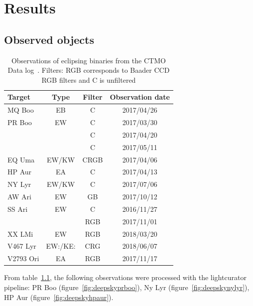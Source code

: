 \chapter{Results}
\section{Observed objects}
\begin{table}
    \centering
    \begin{tabular}[h]{l c c c}
    \toprule
    Target      & Type  & Filter    & Observation date \\ \bottomrule
    MQ Boo      & EB    & C         & 2017/04/26 \\ \midrule
    PR Boo      & EW    & C         & 2017/03/30 \\ \midrule
                &       & C         & 2017/04/20 \\ \midrule
                &       & C         & 2017/05/11 \\ \midrule
    EQ Uma      & EW/KW & CRGB      & 2017/04/06 \\ \midrule
    HP Aur      & EA    & C         & 2017/04/13 \\ \midrule
    NY Lyr      & EW/KW & C         & 2017/07/06 \\ \midrule
    AW Ari      & EW    & GB        & 2017/10/12 \\ \midrule
    SS Ari      & EW    & C         & 2016/11/27 \\ \midrule
                &       & RGB       & 2017/11/01 \\ \midrule
    XX LMi      & EW    & RGB       & 2018/03/20 \\ \midrule
    V467 Lyr    & EW:/KE:& CRG   & 2018/06/07 \\ \midrule
    V2793 Ori   & EA    & RGB   & 2017/11/17 \\
    \bottomrule
    \end{tabular}
    \caption{Observations of eclipsing binaries from the CTMO Data log~\protect\cite{richard_2019b}. Filters: RGB corresponds to Baader CCD RGB filters and C is unfiltered}
\label{tab:observations}
\end{table}

From table~\ref{tab:observations}, the following observations were processed with the lightcurator pipeline:
\@ PR Boo (figure~\ref{fig:deepskyprboo}), Ny Lyr (figure~\ref{fig:deepskynylyr}), HP Aur (figure~\ref{fig:deepskyhpaur}).

